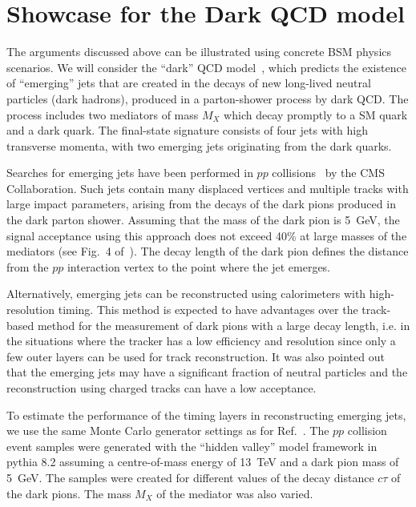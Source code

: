 \section{Showcase for the Dark QCD model}
\label{darksec}

The arguments discussed above can be illustrated using concrete BSM physics scenarios.
We will consider the ``dark'' QCD model~\cite{Bai:2013xga,Schwaller:2015gea}, which predicts 
the existence of ``emerging'' jets 
that are created in the decays of new long-lived neutral 
particles (dark hadrons), produced in a parton-shower process by dark QCD.
The process includes  two mediators of mass $M_X$ which 
decay promptly to a SM quark and a dark quark. 
The final-state signature consists of four jets with high transverse momenta, with two  
 emerging jets originating from the dark quarks.  

Searches for emerging jets have been performed in $pp$ collisions~\cite{Sirunyan:2018njd} 
by the CMS Collaboration. Such jets contain many displaced
 vertices and multiple tracks with large impact parameters, arising from the decays of the dark pions produced in the dark parton shower.
 Assuming that the mass of the dark pion is 5~GeV,  the signal acceptance using this approach does not exceed 40\% at large masses of the mediators
(see Fig.~4 of~\cite{Sirunyan:2018njd}).
The decay length of the dark pion defines the distance from the $pp$ interaction vertex 
to the point where the jet emerges. 

Alternatively, emerging jets can be reconstructed using calorimeters with high-resolution timing. This method is expected
to have advantages over the track-based method 
for the measurement of dark pions with a large decay length, i.e. in the situations where the tracker has a low
efficiency and resolution since only a few outer layers can be used for track reconstruction.
It was also pointed out~\cite{Schwaller:2015gea} that the emerging jets may have a significant fraction of neutral particles and the reconstruction
using charged tracks can have a low acceptance.

To estimate the performance of the timing layers in reconstructing emerging jets,
we use the same Monte Carlo generator settings as for Ref.~\cite{Sirunyan:2018njd}. 
The $pp$ collision event samples  were  generated with the ``hidden valley'' model framework in {\sc pythia} 8.2 assuming a centre-of-mass energy 
 of 13~TeV and a dark pion mass of 5~GeV. The samples were created for different values of the decay distance $c\tau$ of the dark pions.  
The  mass $M_X$ of the mediator was also varied. 

